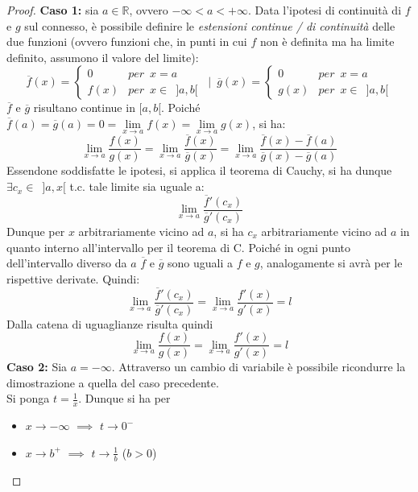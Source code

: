 \documentclass[10pt, oneside]{book}
\theoremstyle{plain}
\begin{document}
\begin{proof}
\textbf{Caso 1:} sia $a \in \mathbb{R}$, ovvero $- \infty < a < + \infty$. Data l'ipotesi di continuità di $f$ e $g$ sul connesso, è possibile definire le \textit{estensioni continue / di continuità} delle due funzioni (ovvero funzioni che, in punti in cui $f$ non è definita ma ha limite definito, assumono il valore del limite):
\[\overline{f}(x) = \begin{cases} 0 & per \enspace x = a \\ f(x)  & per \enspace x \in \enspace ]a, b[
\end{cases} \enspace | \enspace \overline{g}(x) = \begin{cases} 0 & per \enspace x = a \\ g(x)  & per \enspace x \in \enspace ]a, b[
\end{cases}\]
$\overline{f}$ e $\overline{g}$ risultano continue in $[a, b[$. Poiché $\overline{f}(a) = \overline{g}(a) = 0 = \lim \limits_{x \rightarrow a} f(x) = \lim \limits_{x \rightarrow a} g(x)$, si ha:
\[\lim \limits_{x \rightarrow a} \frac{f(x)}{g(x)} = \lim \limits_{x \rightarrow a} \frac{\overline{f}(x)}{\overline{g}(x)} = \lim \limits_{x \rightarrow a} \frac{\overline{f}(x) - \overline{f}(a)}{\overline{g}(x) - \overline{g}(a)}\]
Essendone soddisfatte le ipotesi, si applica il teorema di Cauchy, si ha dunque $\exists c_x \in \enspace ]a, x[$ t.c. tale limite sia uguale a:
\[\lim \limits_{x \rightarrow a} \frac{\overline{f}'(c_x)}{\overline{g}'(c_x)}\]
Dunque per $x$ arbitrariamente vicino ad $a$, si ha $c_x$ arbitrariamente vicino ad $a$ in quanto interno all'intervallo per il teorema di C. Poiché in ogni punto dell'intervallo diverso da $a$ $\overline{f}$ e $\overline{g}$ sono uguali a $f$ e $g$, analogamente si avrà per le rispettive derivate. Quindi:
\[\lim \limits_{x \rightarrow a} \frac{\overline{f}'(c_x)}{\overline{g}'(c_x)} = \lim \limits_{x \rightarrow a} \frac{f'(x)}{g'(x)} = l\]
Dalla catena di uguaglianze risulta quindi
\[\lim \limits_{x \rightarrow a} \frac{f(x)}{g(x)} = \lim \limits_{x \rightarrow a} \frac{f'(x)}{g'(x)} = l\]
\textbf{Caso 2:} Sia $a = - \infty$. Attraverso un cambio di variabile è possibile ricondurre la dimostrazione a quella del caso precedente.\\
Si ponga $t = \frac{1}{x}$. Dunque si ha per
\begin{itemize}[label=$\circ$]
    \item $x \rightarrow - \infty$ $\implies$ $t \rightarrow 0^-$
    \item $x \rightarrow b^+$ $\implies$ $t \rightarrow \frac{1}{b}$ ($b > 0$)

\end{itemize}
\end{proof}
\end{document}
